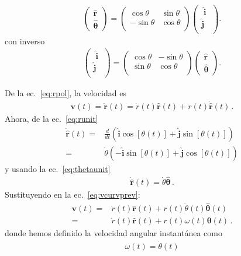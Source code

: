\begin{align}
  \label{eq:polinv}
  \begin{pmatrix}
    \hat{\mathbf{r}}\\
    \hat{\boldsymbol{\theta}}
  \end{pmatrix}=
  \begin{pmatrix}
    \cos\theta&\sin\theta\\
    -\sin\theta&\cos\theta\\
  \end{pmatrix}
  \begin{pmatrix}
    \;\hat{\mathbf{i}}\;\\
    \hat{\mathbf{j}}\\
  \end{pmatrix}.
\end{align}
con inverso
\begin{align}
  \begin{pmatrix}
    \;\hat{\mathbf{i}}\;\\
    \hat{\mathbf{j}}\\
  \end{pmatrix}=
  \begin{pmatrix}
    \cos\theta&-\sin\theta\\
    \sin\theta&\cos\theta\\
  \end{pmatrix}
  \begin{pmatrix}
    \hat{\mathbf{r}}\\
    \hat{\boldsymbol{\theta}}
  \end{pmatrix}.
\end{align}

De la ec.~\eqref{eq:rpol}, la velocidad es
\begin{align}
  \label{eq:vcurvprev}
  \mathbf{v}(t)=\dot{\mathbf{r}}(t)=\dot{r}(t)\hat{\mathbf{r}}(t)+
r(t)\dot{\hat{\mathbf{r}}}(t)\,.
\end{align}
Ahora, de la ec.~\eqref{eq:runit}
\begin{align}
  \dot{\hat{\mathbf{r}}}(t)=&\frac{d}{dt}\left(\hat{\mathbf{i}}\cos[\theta(t)]+\hat{\mathbf{j}}\sin[\theta(t)]\right)\nonumber\\
  =&\dot{\theta}
  \left(
    -\hat{\mathbf{i}}\sin[\theta(t)]+\hat{\mathbf{j}}\cos[\theta(t)]
  \right)
\end{align}
y usando la ec.~\eqref{eq:thetaunit}
\begin{align}
\dot{\hat{\mathbf{r}}}(t)=\dot{\theta}\hat{\boldsymbol{\theta}}\,.
\end{align}
Sustituyendo en la ec.~\eqref{eq:vcurvprev}:
\begin{align}
  \label{eq:vpol}
  \mathbf{v}(t)=&\dot{r}(t)\hat{\mathbf{r}}(t)+r(t)\dot{\theta}(t)\hat{\boldsymbol{\theta}}(t)\nonumber\\
  =&\dot{r}(t)\hat{\mathbf{r}}(t)+r(t)\omega(t)\boldsymbol{\theta}(t)\,.
\end{align}
donde hemos definido la velocidad angular instantánea como
\begin{align}
  \omega(t)=\dot\theta(t)
\end{align}

